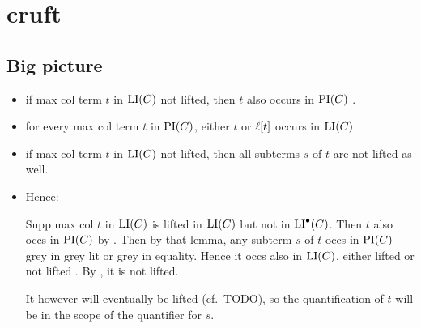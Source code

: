 \documentclass[%
	draft=false,%
	numbers=noendperiod,%
	11pt,%
	a4paper,%
	oneside,%
	openany,%
]{memoir}
\begin{document}
%


\section{cruft}

\subsection{Big picture}

\begin{itemize}
	\item if max col term $t$ in $\operatorname{LI}(C)$ not lifted, then $t$ also occurs in $\operatorname{PI}(C)$ .
	\item for every max col term $t$ in $\operatorname{PI}(C)$, either $t$ or $\ell[t]$ occurs in $\operatorname{LI}(C)$
	\item if max col term $t$ in $\operatorname{LI}(C)$ not lifted, then all subterms $s$ of $t$ are not lifted as well.
	\item Hence: 

		Supp max col $t$ in $\operatorname{LI}(C)$ is lifted in $\operatorname{LI}(C)$ but not in $\operatorname{LI}^\bullet(C)$. \newline
		Then $t$ also occs in $\operatorname{PI}(C)$ by . \newline
		Then by that lemma, any subterm $s$ of $t$ occs in $\operatorname{PI}(C)$ grey in grey lit or grey in equality.
		Hence it occs also in $\operatorname{LI}(C)$, either lifted or not lifted  .\newline
		By , it is not lifted.

		It however will eventually be lifted (cf.\ TODO), so the quantification of $t$ will be in the scope of the quantifier for $s$.
\end{itemize}
\end{document}
